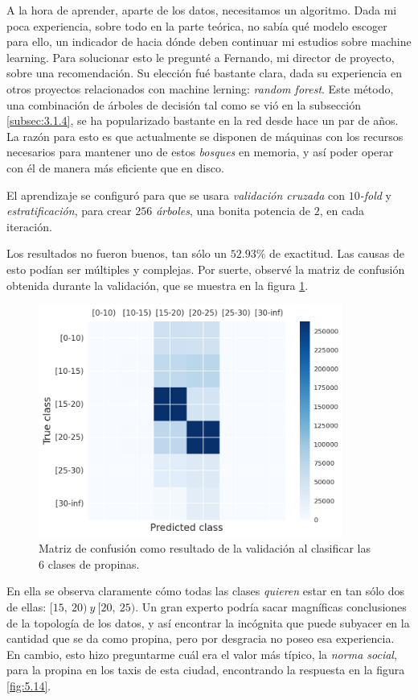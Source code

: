 A la hora de aprender, aparte de los datos, necesitamos un algoritmo. Dada mi poca experiencia, sobre todo en la parte teórica, no sabía qué modelo escoger para ello, un indicador de hacia dónde deben continuar mi estudios sobre machine learning. Para solucionar esto le pregunté a Fernando, mi director de proyecto, sobre una recomendación. Su elección fué bastante clara, dada su experiencia en otros proyectos relacionados con machine lerning: \emph{random forest}. Este método, una combinación de árboles de decisión tal como se vió en la subsección \ref{subsec:3.1.4}, se ha popularizado bastante en la red desde hace un par de años. La razón para esto es que actualmente se disponen de máquinas con los recursos necesarios para mantener uno de estos \emph{bosques} en memoria, y así poder operar con él de manera más eficiente que en disco.

El aprendizaje se configuró para que se usara \emph{validación cruzada} con \emph{$10$-fold} y \emph{estratificación}, para crear \emph{$256$ árboles}, una bonita potencia de $2$, en cada iteración.

Los resultados no fueron buenos, tan sólo un $52.93\%$ de exactitud. Las causas de esto podían ser múltiples y complejas. Por suerte, observé la matriz de confusión obtenida durante la validación, que se muestra en la figura \ref{fig:5.13}.

\begin{figure}[H]
  \centering
  \includegraphics[width=100mm]{figures/ch_05/confusion_matrix_1.png}
  \caption{Matriz de confusión como resultado de la validación al clasificar las 6 clases de propinas.}
  \label{fig:5.13}
\end{figure}

En ella se observa claramente cómo todas las clases \emph{quieren} estar en tan sólo dos de ellas: $[15,\:20)\:y\:[20,\:25)$. Un gran experto podría sacar magníficas conclusiones de la topología de los datos, y así encontrar la incógnita que puede subyacer en la cantidad que se da como propina, pero por desgracia no poseo esa experiencia. En cambio, esto hizo preguntarme cuál era el valor más típico, la \emph{norma social}, para la propina en los taxis de esta ciudad, encontrando la respuesta en la figura \ref{fig:5.14}.

